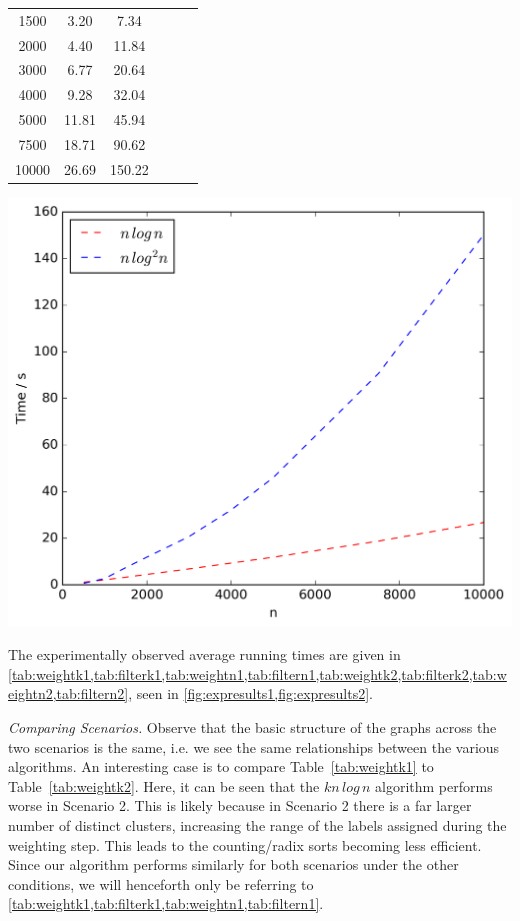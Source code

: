 \documentclass{article}
\begin{document}
\begin{table}[!ht]
\begin{minipage}{0.48\textwidth}
\begin{tabular}{c||ccccc}
                1500 & 3.20 & 7.34\\
                2000 & 4.40 & 11.84\\
                3000 & 6.77 & 20.64\\
                4000 & 9.28 & 32.04\\
                5000 & 11.81 & 45.94\\
                7500 & 18.71 & 90.62\\
                10000 & 26.69 & 150.22\\
            \end{tabular}
            \includegraphics[scale=0.4]{varyingn2_filter}
        \end{minipage}
        \label{fig:expresults2}
    \end{table}

    The experimentally observed average running times are given in \cref{tab:weightk1,tab:filterk1,tab:weightn1,tab:filtern1,tab:weightk2,tab:filterk2,tab:weightn2,tab:filtern2}, seen in \cref{fig:expresults1,fig:expresults2}.

    \textit{Comparing Scenarios.} Observe that the basic structure of the graphs across the two scenarios is the same, i.e. we see the same relationships between the various algorithms. An interesting case is to compare Table~\ref{tab:weightk1} to Table~\ref{tab:weightk2}. Here, it can be seen that the $kn\,log\,n$ algorithm performs worse in Scenario 2. This is likely because in Scenario 2 there is a far larger number of distinct clusters, increasing the range of the labels assigned during the weighting step. This leads to the counting/radix sorts becoming less efficient. Since our algorithm performs similarly for both scenarios under the other conditions, we will henceforth only be referring to \cref{tab:weightk1,tab:filterk1,tab:weightn1,tab:filtern1}.
\end{document}
